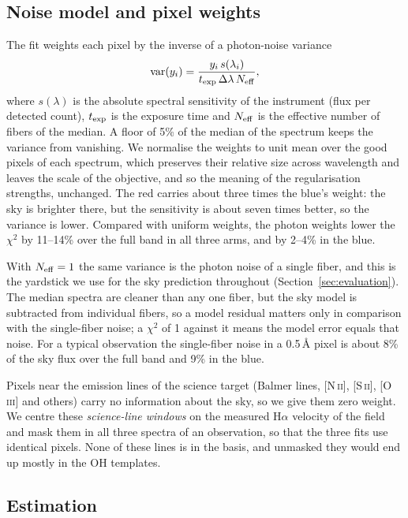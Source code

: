 \subsection{Noise model and pixel weights}
\label{sec:noise}

The fit weights each pixel by the inverse of a photon-noise variance
\begin{equation}
  \operatorname{var}(y_i) = \frac{y_i\,s(\lambda_i)}{t_{\rm exp}\,\Delta\lambda\,N_{\rm eff}},
\end{equation}
where $s(\lambda)$ is the absolute spectral sensitivity of the instrument
(flux per detected count), $t_{\rm exp}$ is the exposure time and
$N_{\rm eff}$ is the effective number of fibers of the median. A floor of 5\%
of the median of the spectrum keeps the variance from vanishing. We
normalise the weights to unit mean over the good pixels of each spectrum,
which preserves their relative size across wavelength and leaves the scale
of the objective, and so the meaning of the regularisation strengths,
unchanged. The red carries about three times the blue's weight: the sky is
brighter there, but the sensitivity is about seven times better, so the
variance is lower. Compared with uniform weights, the photon weights lower
the $\chi^2$ by 11--14\% over the full band in all three arms, and by 2--4\%
in the blue.

With $N_{\rm eff}=1$ the same variance is the photon noise of a single
fiber, and this is the yardstick we use for the sky prediction throughout
(Section~\ref{sec:evaluation}). The median spectra are cleaner than any one
fiber, but the sky model is subtracted from individual fibers, so a model
residual matters only in comparison with the single-fiber noise; a $\chi^2$
of 1 against it means the model error equals that noise. For a typical
observation the single-fiber noise in a 0.5\,\AA{} pixel is about 8\% of the
sky flux over the full band and 9\% in the blue.

Pixels near the emission lines of the science target (Balmer lines,
[N\,\textsc{ii}], [S\,\textsc{ii}], [O\,\textsc{iii}] and others) carry no
information about the sky, so we give them zero weight. We centre these
\emph{science-line windows} on the measured H$\alpha$ velocity of the field
and mask them in all three spectra of an observation, so that the three fits
use identical pixels. None of these lines is in the basis, and unmasked they
would end up mostly in the OH templates.

\subsection{Estimation}
\label{sec:estimation}

